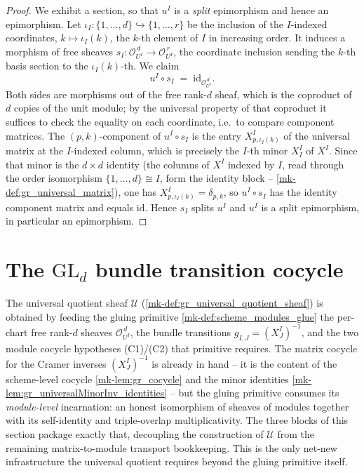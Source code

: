 \begin{proof}
  We exhibit a section, so that \(u^I\) is a \emph{split} epimorphism and hence an
  epimorphism. Let \(\iota_I : \{1,\dots,d\} \hookrightarrow \{1,\dots,r\}\) be the
  inclusion of the \(I\)-indexed coordinates, \(k \mapsto \iota_I(k)\), the
  \(k\)-th element of \(I\) in increasing order. It induces a morphism of free
  sheaves \(s_I : \mathcal{O}_{U^I}^{\,d} \to \mathcal{O}_{U^I}^{\,r}\), the
  coordinate inclusion sending the \(k\)-th basis section to the
  \(\iota_I(k)\)-th. We claim
  \[
    u^I \circ s_I \;=\; \mathrm{id}_{\mathcal{O}_{U^I}^{\,d}}.
  \]
  Both sides are morphisms out of the free rank-\(d\) sheaf, which is the coproduct
  of \(d\) copies of the unit module; by the universal property of that coproduct
  it suffices to check the equality on each coordinate, i.e.\ to compare component
  matrices. The \((p,k)\)-component of \(u^I \circ s_I\) is the entry
  \(X^I_{p,\iota_I(k)}\) of the universal matrix at the \(I\)-indexed column, which
  is precisely the \(I\)-th minor \(X^I_I\) of \(X^I\). Since that minor is the
  \(d \times d\) identity (the columns of \(X^I\) indexed by \(I\), read through the
  order isomorphism \(\{1,\dots,d\} \cong I\), form the identity block --
  \ref{mk-def:gr_universal_matrix}), one has \(X^I_{p,\iota_I(k)} = \delta_{p,k}\),
  so \(u^I \circ s_I\) has the identity component matrix and equals
  \(\mathrm{id}\). Hence \(s_I\) splits \(u^I\) and \(u^I\) is a split
  epimorphism, in particular an epimorphism.
\end{proof}

\section{The \(\mathrm{GL}_d\) bundle transition cocycle}
\label{mk-sec:grquot_bundle_cocycle}

The universal quotient sheaf \(\mathcal{U}\) (\ref{mk-def:gr_universal_quotient_sheaf}) is
obtained by feeding the gluing primitive \ref{mk-def:scheme_modules_glue} the per-chart free
rank-\(d\) sheaves \(\mathcal{O}_{U^I}^{\,d}\), the bundle transitions
\(g_{I,J} = (X^I_J)^{-1}\), and the two module cocycle hypotheses (C1)/(C2) that primitive
requires. The matrix cocycle for the Cramer inverses \((X^I_J)^{-1}\) is already in hand --
it is the content of the scheme-level cocycle \ref{mk-lem:gr_cocycle} and the minor identities
\ref{mk-lem:gr_universalMinorInv_identities} -- but the gluing primitive consumes its
\emph{module-level} incarnation: an honest isomorphism of sheaves of modules together with
its self-identity and triple-overlap multiplicativity. The three blocks of this section
package exactly that, decoupling the construction of \(\mathcal{U}\) from the remaining
matrix-to-module transport bookkeeping. This is the only net-new infrastructure the
universal quotient requires beyond the gluing primitive itself.


